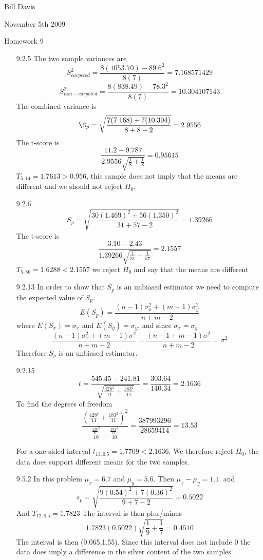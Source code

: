 \documentclass[11pt,fleqn]{article}
\begin{document}
\newcommand{\mbf}[1]{\mbox{{\bfseries #1}}}
\newcommand{\N}{\mbf{N}}
\renewcommand{\O}{\mbf{O}}
\newcommand{\tabfrac}[2]{%
	\setlength{\fboxrule}{0pt}%
	\fbox{$\frac{#1}{#2}$}%
}

\noindent Bill Davis 

\noindent November 5th 2009 

\noindent Homework 9

\begin{enumerate}
  
  \item[9.2.5]
  The two sample variances are 
  \[
  	S_{carpeted}^2 = \frac{8(1053.70) - 89.6^2}{8(7)} = 7.168571429
  \]
    \[
  	S_{non-carpeted}^2 = \frac{8(838.49) - 78.3^2}{8(7)} = 10.304107143
  \]
  The combined variance is
  \[
  	\S_p =\sqrt{ \frac{7(7.168) + 7(10.304)}{8+8-2} } = 2.9556
  \]
  The t-score is 
  \[
  \frac{11.2-9.787}{2.9556\sqrt{\frac{1}{8}+\frac{1}{8}}} =  0.95615
  \]
  $T_{5,14} = 1.7613 > 0.956$, this sample does not imply that the means are
  different and we should not reject $H_0$.
  
  \item[9.2.6]
  \[
  S_p = \sqrt{\frac{30(1.469)^2+56(1.350)^2}{31+57-2}} = 1.39266
  \]
  The t-score is 
  \[
\frac{3.10-2.43}{1.39266\sqrt{\frac{1}{31}+\frac{1}{57}}} = 2.1557
  \]
    $T_{5,86} = 1.6288 < 2.1557$ we reject $H_0$ and say that the means are
  different
  \item[9.2.13]
In order to show that $S_p$ is an unbiased estimator we need to compute the
expected value of $S_p$. 
\[
E(S_p) = \frac{(n-1)\sigma_x^2 + (m-1)\sigma_y^2}{n+m-2}
\]
where $E(S_x) = \sigma_x$ and $E(S_y) = \sigma_y$, and since $\sigma_x =
\sigma_y$
\[
\frac{(n-1)\sigma_x^2 + (m-1)\sigma^2}{n+m-2} =\frac{(n-1 +
m-1)\sigma^2}{n+m-2}  = \sigma^2
\]
Therefore $S_p$ is an unbiased estimator. 

  \item[9.2.15]
  \[
  t = \frac{545.45 - 241.81}{\sqrt{\frac{428^2}{11}+\frac{183^2}{11}}} =
  \frac{303.64}{140.34} = 2.1636
  \]
  To find the degrees of freedom
  \[
  \frac{(\frac{428^2}{11}+\frac{183^2}{11})^2}{\frac{\frac{428}{11}^2}{10} +
  \frac{\frac{183}{11}^2}{10}} = \frac{387993296}{28659414} = 13.53
  \]

	For a one-sided interval $t_{13,0.5}  = 1.7709 < 2.1636$. We therefore reject
	$H_0$, the data does support different means for the two samples. 
  \item[9.5.2]
  In this problem $\mu_x = 6.7$ and $\mu_y = 5.6$. Then $\mu_x-\mu_y = 1.1$.
  and 
  \[
  s_p = \sqrt{\frac{9(0.54)^2+7(0.36)^2}{9+7-2}} = 0.5022
  \]
  And $T_{12,0.5} = 1.7823$ The interval is then plus/minus 
  \[
1.7823(0.5022)\sqrt{\frac{1}{9}+\frac{1}{7}} = 0.4510  
  \]
  The interval is then (0.065,1.55). Since this interval does not include 0
  the data does imply a difference in the silver content of the two samples. 
  

\end{enumerate}
\end{document}
